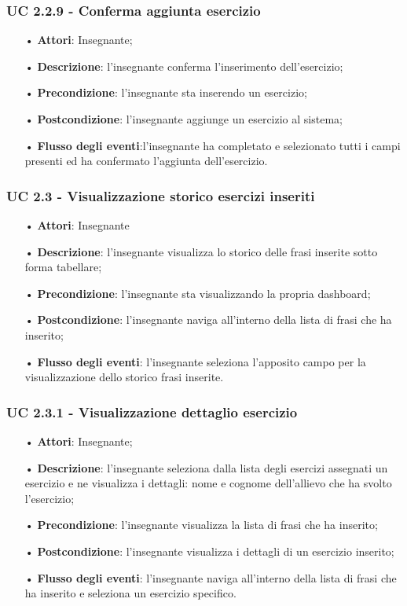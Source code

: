 \subsubsection{UC 2.2.9 - Conferma aggiunta esercizio}
\begin{itemize}
	\item[•] \textbf{Attori}: Insegnante;
	\item[•] \textbf{Descrizione}: l'insegnante conferma l'inserimento dell'esercizio;
	\item[•] \textbf{Precondizione}: l'insegnante sta inserendo un esercizio;
	\item[•] \textbf{Postcondizione}: l'insegnante aggiunge un esercizio al sistema;
	\item[•] \textbf{Flusso degli eventi}:l'insegnante ha completato e selezionato tutti i campi presenti ed ha confermato l'aggiunta dell'esercizio.
\end{itemize}


\subsubsection{UC 2.3 - Visualizzazione storico esercizi inseriti}
\begin{itemize}
	\item[•] \textbf{Attori}: Insegnante	   
	\item[•] \textbf{Descrizione}: l'insegnante visualizza lo storico delle frasi inserite sotto forma tabellare; 
	\item[•] \textbf{Precondizione}: l'insegnante sta visualizzando la propria dashboard;
	\item[•] \textbf{Postcondizione}: l'insegnante naviga all'interno della lista di frasi che ha inserito;
	\item[•] \textbf{Flusso degli eventi}: l'insegnante seleziona l'apposito campo per la visualizzazione dello storico frasi inserite.
\end{itemize}


\subsubsection{UC 2.3.1 - Visualizzazione dettaglio esercizio}
\begin{itemize}
	\item[•] \textbf{Attori}: Insegnante;
	\item[•] \textbf{Descrizione}: l'insegnante seleziona dalla lista degli esercizi assegnati un esercizio e ne visualizza i dettagli: nome e cognome dell'allievo che ha svolto l'esercizio;
	\item[•] \textbf{Precondizione}: l'insegnante visualizza la lista di frasi che ha inserito;
	\item[•] \textbf{Postcondizione}: l'insegnante visualizza i dettagli di un esercizio inserito;
	\item[•] \textbf{Flusso degli eventi}: l'insegnante naviga all'interno della lista di frasi che ha inserito e seleziona un esercizio specifico.
\end{itemize}


